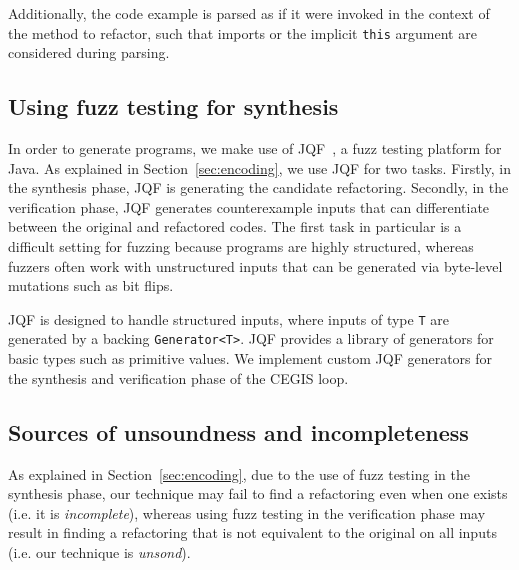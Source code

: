 \documentclass[10pt,conference]{IEEEtran}
\begin{document}
Additionally, the code example is parsed as if it were invoked in the context of
the method to refactor, such that imports or the implicit \texttt{this} argument
are considered during parsing.

\subsection{Using fuzz testing for synthesis} \label{sec:fuzzing}

In order to generate programs, we make use of JQF~\cite{DBLP:conf/issta/PadhyeLS19}, a  %
fuzz testing platform for Java.
%
As explained in Section~\ref{sec:encoding}, we use JQF for two tasks. Firstly, in the synthesis phase, 
JQF is generating the candidate refactoring.
Secondly, in the verification phase, JQF generates
counterexample inputs that can differentiate between the original and refactored codes.
The first task in particular is a difficult setting for fuzzing because programs are
highly structured, whereas fuzzers often work with unstructured inputs
that can be generated via byte-level mutations such as bit flips.

JQF is designed to handle structured inputs, where inputs of type \texttt{T}
are generated by a backing \texttt{Generator<T>}. JQF provides a library of
generators for basic types such as primitive values. We implement custom
JQF generators for the synthesis and verification phase of the CEGIS loop. %



\subsection{Sources of unsoundness and incompleteness}\label{sec:incompleteness}
As explained in Section~\ref{sec:encoding}, due to the use of fuzz
testing in the synthesis phase, our technique may fail to find a
refactoring even when one exists (i.e. it is {\em incomplete}),
whereas using fuzz testing in the verification phase may result in
finding a refactoring that is not equivalent to the original on all
inputs (i.e. our technique is {\em unsond}).
\end{document}
